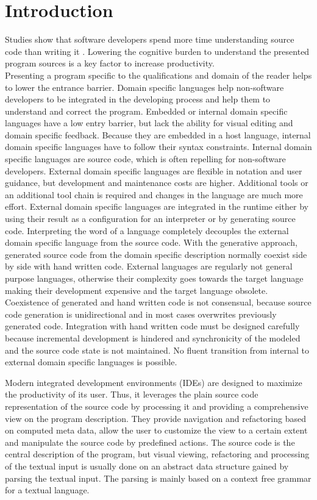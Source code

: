 \chapter{Introduction}
\label{cha:introduction}
Studies show that software developers spend more time understanding source code than writing it \cite{uistudy}. Lowering the cognitive burden to understand the presented program sources is a key factor to increase productivity. \\

Presenting a program specific to the qualifications and domain of the reader helps to lower the entrance barrier. Domain specific languages help non-software developers to be integrated in the developing process and help them to understand and correct the program. Embedded or internal domain specific languages have a low entry barrier, but lack the ability for visual editing and domain specific feedback. Because they are embedded in a host language, internal domain specific languages have to follow their syntax constraints. Internal domain specific languages are source code, which is often repelling for non-software developers. External domain specific languages are flexible in notation and user guidance, but development and maintenance costs are higher. Additional tools or an additional tool chain is required and changes in the language are much more effort. External domain specific languages are integrated in the runtime either by using their result as a configuration for an interpreter or by generating source code. Interpreting the word of a language completely decouples the external domain specific language from the source code. With the generative approach, generated source code from the domain specific description normally coexist side by side with hand written code. External languages are regularly not general purpose languages, otherwise their complexity goes towards the target language making their development expensive and the target language obsolete. Coexistence of generated and hand written code is not consensual, because source code generation is unidirectional and in most cases overwrites previously generated code. Integration with hand written code must be designed carefully because incremental development is hindered and synchronicity of the modeled and the source code state is not maintained. No fluent transition from internal to external domain specific languages is possible.   

Modern integrated development environments (IDEs) are designed to maximize the productivity of its user. Thus, it leverages the plain source code representation of the source code by processing it and providing a comprehensive view on the program description. They provide navigation and refactoring based on computed meta data, allow the user to customize the view to a certain extent and manipulate the source code by predefined actions. The source code is the central description of the program, but visual viewing, refactoring and processing of the textual input is usually done on an abstract data structure gained by parsing the textual input. The parsing is mainly based on a context free grammar for a textual language. 

